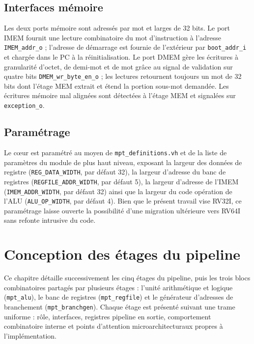 \documentclass[11pt,a4paper,oneside]{report}
\begin{document}
\section{Interfaces mémoire}
Les deux ports mémoire sont adressés par mot et larges de 32
bits. Le port IMEM fournit une lecture combinatoire du mot
d'instruction à l'adresse \texttt{IMEM\_addr\_o} ; l'adresse de
démarrage est fournie de l'extérieur par \texttt{boot\_addr\_i}
et chargée dans le PC à la réinitialisation. Le port DMEM gère
les écritures à granularité d'octet, de demi-mot et de mot grâce
au signal de validation sur quatre bits
\texttt{DMEM\_wr\_byte\_en\_o} ; les lectures retournent toujours
un mot de 32 bits dont l'étage MEM extrait et étend la portion
sous-mot demandée. Les écritures mémoire mal alignées sont
détectées à l'étage MEM et signalées sur \texttt{exception\_o}.

\section{Paramétrage}
Le c\oe{}ur est paramétré au moyen de \texttt{mpt\_definitions.vh}
et de la liste de paramètres du module de plus haut niveau,
exposant la largeur des données de registre
(\texttt{REG\_DATA\_WIDTH}, par défaut 32), la largeur d'adresse
du banc de registres (\texttt{REGFILE\_ADDR\_WIDTH}, par défaut
5), la largeur d'adresse de l'IMEM (\texttt{IMEM\_ADDR\_WIDTH},
par défaut 32) ainsi que la largeur du code opération de l'ALU
(\texttt{ALU\_OP\_WIDTH}, par défaut 4). Bien que le présent
travail vise RV32I, ce paramétrage laisse ouverte la possibilité
d'une migration ultérieure vers RV64I sans refonte intrusive du
code.


\chapter{Conception des étages du pipeline}
\label{ch:pipeline}

Ce chapitre détaille successivement les cinq étages du pipeline,
puis les trois blocs combinatoires partagés par plusieurs étages :
l'unité arithmétique et logique (\texttt{mpt\_alu}), le banc de
registres (\texttt{mpt\_regfile}) et le générateur d'adresses de
branchement (\texttt{mpt\_branchgen}). Chaque étage est présenté
suivant une trame uniforme : rôle, interfaces, registres pipeline
en sortie, comportement combinatoire interne et points d'attention
microarchitecturaux propres à l'implémentation.
\end{document}
